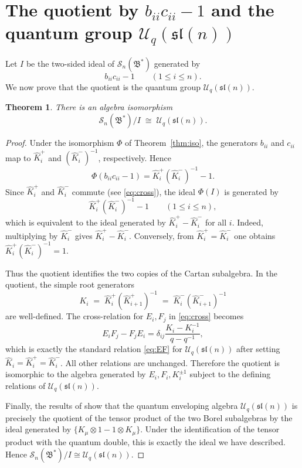 \documentclass{article}
\newtheorem{theorem}{Theorem}[section]
\theoremstyle{definition}
\newcommand{\Uc}{\mathcal{U}}
\newcommand{\bcS}{\mathcal{S}}
\newcommand{\fB}{\mathfrak{B}}
\newcommand{\sl}{\mathfrak{sl}}
\begin{document}
\section{The quotient by $b_{ii}c_{ii}-1$ and the quantum group $\Uc_q(\sl(n))$}

Let $I$ be the two-sided ideal of $\bcS_n(\fB^*)$ generated by
\[
b_{ii}c_{ii}-1\qquad (1\le i\le n).
\]
We now prove that the quotient is the quantum group $\Uc_q(\sl(n))$.

\begin{theorem}\label{thm:main}
There is an algebra isomorphism
\[
\bcS_n(\fB^*)/I \;\cong\; \Uc_q(\sl(n)).
\]
\end{theorem}

\begin{proof}
Under the isomorphism $\Phi$ of Theorem~\ref{thm:iso}, the generators $b_{ii}$ and $c_{ii}$ map to $\hat K_i^+$ and $(\hat K_i^-)^{-1}$, respectively. Hence
\[
\Phi(b_{ii}c_{ii}-1) = \hat K_i^+(\hat K_i^-)^{-1} - 1.
\]
Since $\hat K_i^+$ and $\hat K_i^-$ commute (see \eqref{eq:cross}), the ideal $\Phi(I)$ is generated by
\[
\hat K_i^+(\hat K_i^-)^{-1} - 1 \qquad (1\le i\le n),
\]
which is equivalent to the ideal generated by $\hat K_i^+ - \hat K_i^-$ for all $i$. Indeed, multiplying by $\hat K_i^-$ gives $\hat K_i^+ - \hat K_i^-$. Conversely, from $\hat K_i^+=\hat K_i^-$ one obtains $\hat K_i^+(\hat K_i^-)^{-1}=1$.

Thus the quotient identifies the two copies of the Cartan subalgebra. In the quotient, the simple root generators
\[
K_i \;=\; \hat K_i^+(\hat K_{i+1}^+)^{-1} \;=\; \hat K_i^-(\hat K_{i+1}^-)^{-1}
\]
are well-defined. The cross-relation for $E_i,F_j$ in \eqref{eq:cross} becomes
\[
E_i F_j - F_j E_i = \delta_{ij}\frac{K_i - K_i^{-1}}{q-q^{-1}},
\]
which is exactly the standard relation \eqref{eq:EF} for $\Uc_q(\sl(n))$ after setting $\hat K_i=\hat K_i^+=\hat K_i^-$. All other relations are unchanged. Therefore the quotient is isomorphic to the algebra generated by $E_i,F_i,K_i^{\pm1}$ subject to the defining relations of $\Uc_q(\sl(n))$.

Finally, the results of \cite[Section~2.4]{CambridgeBorel} show that the quantum enveloping algebra $\Uc_q(\sl(n))$ is precisely the quotient of the tensor product of the two Borel subalgebras by the ideal generated by $\{K_\mu\otimes 1 - 1\otimes K_\mu\}$. Under the identification of the tensor product with the quantum double, this is exactly the ideal we have described. Hence $\bcS_n(\fB^*)/I \cong \Uc_q(\sl(n))$.
\end{proof}
\end{document}
